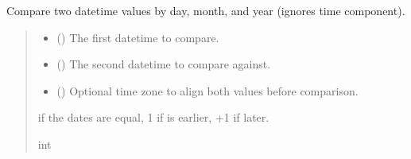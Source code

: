 \documentclass[letterpaper,10pt,english]{sphinxmanual}
\begin{document}
\begin{fulllineitems}
\begin{fulllineitems}
\label{\detokenize{apache_commons_validator_python.routines:apache_commons_validator_python.routines.date_validator.DateValidator.compare_dates}}
\pysigstartsignatures
{}
\pysigstopsignatures
\sphinxAtStartPar
Compare two datetime values by day, month, and year (ignores time component).
\begin{quote}\begin{description}
\begin{itemize}
\item {} 
\sphinxAtStartPar
{} () \textendash{} The first datetime to compare.

\item {} 
\sphinxAtStartPar
{} () \textendash{} The second datetime to compare against.

\item {} 
\sphinxAtStartPar
{} (\sphinxstyleliteralemphasis{\sphinxupquote{{[}}}\sphinxstyleliteralemphasis{\sphinxupquote{{]}}}) \textendash{} Optional time zone to align both values before comparison.

\end{itemize}

 if the dates are equal, \sphinxhyphen{}1 if  is earlier, +1 if later.

\sphinxAtStartPar
int

\end{description}\end{quote}

\end{fulllineitems}


\end{fulllineitems}
\end{document}
